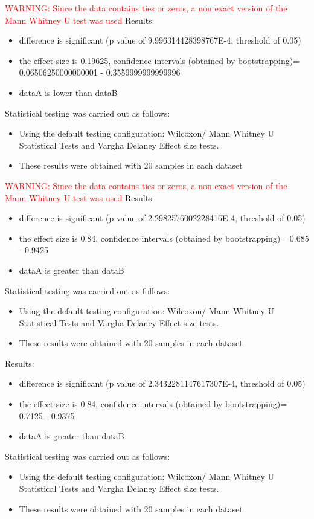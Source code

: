 \documentclass[]{article}
\begin{document}
\textcolor{Red}{WARNING: Since the data contains ties or zeros, a non exact version of the Mann Whitney U test was used}
Results:
\begin{itemize}
\item{difference is significant (p value of 9.996314428398767E-4, threshold of 0.05)}
\item{the effect size is 0.19625, confidence intervals (obtained by bootstrapping)= 0.06506250000000001 - 0.3559999999999996}
\item{dataA is lower than dataB}
\end{itemize}Statistical testing was carried out as follows: \begin{itemize}
\item{Using the default testing configuration: Wilcoxon/ Mann Whitney U Statistical Tests and Vargha Delaney Effect size tests.}
\item{These results were obtained with 20 samples in each dataset}
\end{itemize}
\textcolor{Red}{WARNING: Since the data contains ties or zeros, a non exact version of the Mann Whitney U test was used}
Results:
\begin{itemize}
\item{difference is significant (p value of 2.2982576002228416E-4, threshold of 0.05)}
\item{the effect size is 0.84, confidence intervals (obtained by bootstrapping)= 0.685 - 0.9425}
\item{dataA is greater than dataB}
\end{itemize}Statistical testing was carried out as follows: \begin{itemize}
\item{Using the default testing configuration: Wilcoxon/ Mann Whitney U Statistical Tests and Vargha Delaney Effect size tests.}
\item{These results were obtained with 20 samples in each dataset}
\end{itemize}Results:
\begin{itemize}
\item{difference is significant (p value of 2.3432281147617307E-4, threshold of 0.05)}
\item{the effect size is 0.84, confidence intervals (obtained by bootstrapping)= 0.7125 - 0.9375}
\item{dataA is greater than dataB}
\end{itemize}Statistical testing was carried out as follows: \begin{itemize}
\item{Using the default testing configuration: Wilcoxon/ Mann Whitney U Statistical Tests and Vargha Delaney Effect size tests.}
\item{These results were obtained with 20 samples in each dataset}
\end{itemize}
\end{document}
